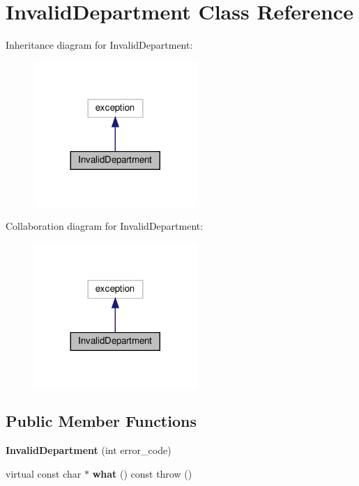 \hypertarget{classInvalidDepartment}{}\section{Invalid\+Department Class Reference}
\label{classInvalidDepartment}


Inheritance diagram for Invalid\+Department\+:\nopagebreak
\begin{figure}[H]
\begin{center}
\leavevmode
\includegraphics[width=176pt]{classInvalidDepartment__inherit__graph}
\end{center}
\end{figure}


Collaboration diagram for Invalid\+Department\+:\nopagebreak
\begin{figure}[H]
\begin{center}
\leavevmode
\includegraphics[width=176pt]{classInvalidDepartment__coll__graph}
\end{center}
\end{figure}
\subsection*{Public Member Functions}
\begin{DoxyCompactItemize}
\item 
\mbox{\label{classInvalidDepartment_ae3c8a8a0d280123ef5225355512bd080}} 
{\bfseries Invalid\+Department} (int error\+\_\+code)
\item 
\mbox{\label{classInvalidDepartment_a5cfcc2e3de7111deca40f63619cd850f}} 
virtual const char $\ast$ {\bfseries what} () const  throw ()
\end{DoxyCompactItemize}


